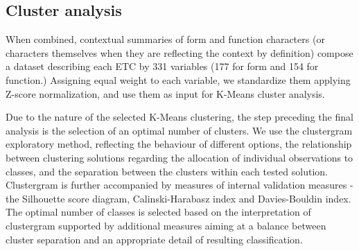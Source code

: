 \subsection*{Cluster analysis}



When combined, contextual summaries of form and function characters (or characters
themselves when they are reflecting the context by definition) compose a dataset
describing each ETC by 331 variables (177 for form and 154 for function.)
Assigning equal weight to each variable, we standardize them applying
Z-score normalization, and use them as input for K-Means cluster analysis.

Due to the nature of the selected K-Means clustering, the step preceding the final
analysis is the selection of an optimal number of clusters. We use the
clustergram exploratory method\cite{schonlau2002clustergram}, reflecting the behaviour of different options, the relationship
between clustering solutions regarding the allocation of individual observations to
classes, and the separation between the clusters within each tested solution.
Clustergram is further accompanied by measures of internal validation measures - the
Silhouette score diagram, Calinski-Harabasz index\cite{calinski1974} and Davies-Bouldin index\cite{davies1979cluster}. The optimal
number of classes is selected based on the interpretation of clustergram supported by
additional measures aiming at a balance between cluster separation and an appropriate
detail of resulting classification.

